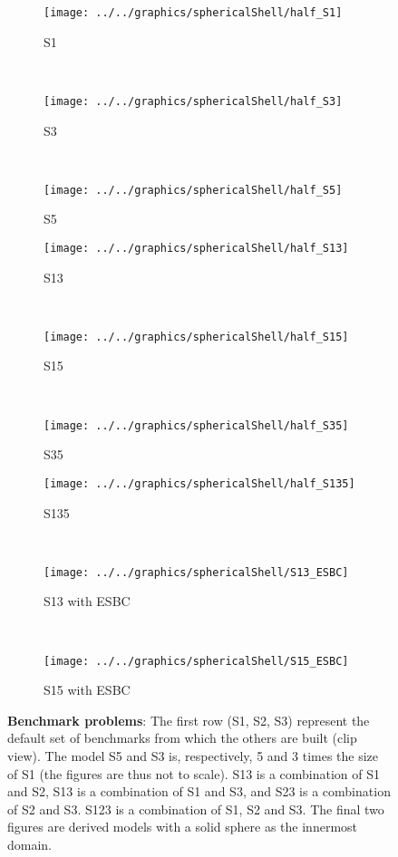\begin{figure}
	\centering
	\begin{subfigure}{0.3\textwidth}
		\centering
		\texttt{[image: ../../graphics/sphericalShell/half\_S1]}
		\caption{S1}
    \end{subfigure}
	~
	\begin{subfigure}{0.3\textwidth}
		\centering
		\texttt{[image: ../../graphics/sphericalShell/half\_S3]}
		\caption{S3}
    \end{subfigure}
	~
	\begin{subfigure}{0.3\textwidth}
		\centering
		\texttt{[image: ../../graphics/sphericalShell/half\_S5]}
		\caption{S5}
    \end{subfigure}
	\par\bigskip
	\begin{subfigure}{0.3\textwidth}
		\centering
		\texttt{[image: ../../graphics/sphericalShell/half\_S13]}
		\caption{S13}
    \end{subfigure}
	~
	\begin{subfigure}{0.3\textwidth}
		\centering
		\texttt{[image: ../../graphics/sphericalShell/half\_S15]}
		\caption{S15}
    \end{subfigure}
	~
	\begin{subfigure}{0.3\textwidth}
		\centering
		\texttt{[image: ../../graphics/sphericalShell/half\_S35]}
		\caption{S35}
    \end{subfigure}
	\par\bigskip
	\begin{subfigure}{0.3\textwidth}
		\centering
		\texttt{[image: ../../graphics/sphericalShell/half\_S135]}
		\caption{S135}
    \end{subfigure}
	~
	\begin{subfigure}{0.3\textwidth}
		\centering
		\texttt{[image: ../../graphics/sphericalShell/S13\_ESBC]}
		\caption{S13 with ESBC}
		\label{Fig1:S12_ASI_3NN}
    \end{subfigure}
	~
	\begin{subfigure}{0.3\textwidth}
		\centering
		\texttt{[image: ../../graphics/sphericalShell/S15\_ESBC]}
		\caption{S15 with ESBC}
		\label{Fig1:S23_ASI_3NN}
    \end{subfigure}
    \caption{\textbf{Benchmark problems}: The first row (S1, S2, S3) represent the default set of benchmarks from which the others are built (clip view). The model S5 and S3 is, respectively, 5 and 3 times the size of S1 (the figures are thus not to scale). S13 is a combination of S1 and S2, S13 is a combination of S1 and S3, and S23 is a combination of S2 and S3. S123 is a combination of S1, S2 and S3. The final two figures are derived models with a solid sphere as the innermost domain.}
	\label{Fig1:BenchmarksProblems}
\end{figure}

